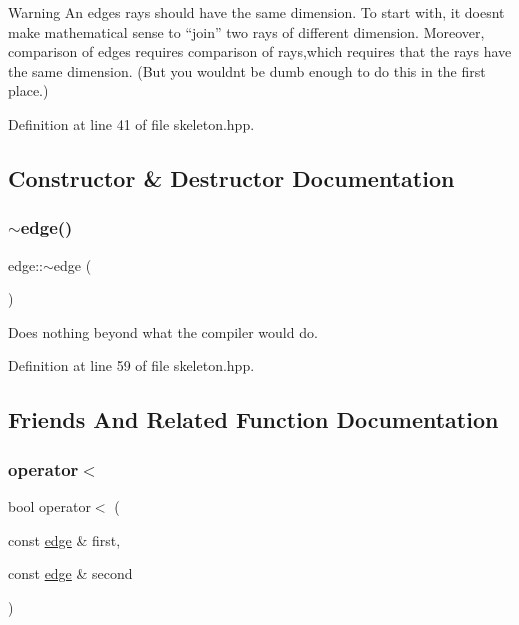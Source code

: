 \begin{DoxyWarning}{Warning}
An edge\textquotesingle{}s rays should have the same dimension. To start with, it doesn\textquotesingle{}t make mathematical sense to ``join'' two rays of different dimension. Moreover, comparison of edges requires comparison of rays,which requires that the rays have the same dimension. (But you wouldn\textquotesingle{}t be dumb enough to do this in the first place.) 
\end{DoxyWarning}


Definition at line 41 of file skeleton.\+hpp.



\subsection{Constructor \& Destructor Documentation}
\mbox{\label{classedge_a6295b7f8e62fa95cd887fb78d64347f5}} 
\subsubsection{\texorpdfstring{$\sim$edge()}{~edge()}}
{\footnotesize\ttfamily edge\+::$\sim$edge (\begin{DoxyParamCaption}{ }\end{DoxyParamCaption})\hspace{0.3cm}{\ttfamily [inline]}}

Does nothing beyond what the compiler would do. 

Definition at line 59 of file skeleton.\+hpp.



\subsection{Friends And Related Function Documentation}
\mbox{\label{classedge_a983f5438e6720d3bc1d7763c0c04fcae}} 
\subsubsection{\texorpdfstring{operator$<$}{operator<}}
{\footnotesize\ttfamily bool operator$<$ (\begin{DoxyParamCaption}\item[{const \hyperlink{classedge}{edge} \&}]{first,  }\item[{const \hyperlink{classedge}{edge} \&}]{second }\end{DoxyParamCaption})\hspace{0.3cm}{\ttfamily [friend]}}



